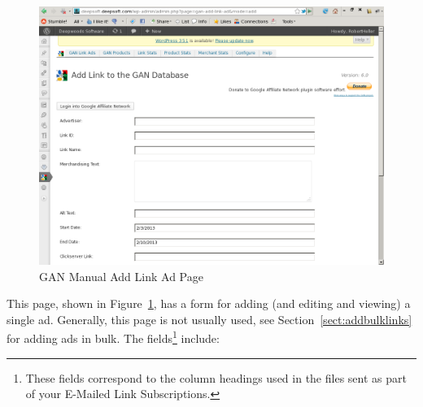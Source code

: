 \documentclass[letterpaper]{article}
\begin{document}
\begin{figure}[ht]
\begin{centering}
\includegraphics[width=4.5in]{ganaddlinkad.png}
\caption{GAN Manual Add Link Ad Page}
\label{fig:ganaddlinkad}
\end{centering}
\end{figure}
This page, shown in Figure~\ref{fig:ganaddlinkad}, has a form for adding
(and editing and viewing) a single ad. Generally, this page is not
usually used, see Section~\ref{sect:addbulklinks} for adding ads in bulk.
The fields\footnote{These fields correspond to the column headings used
in the files sent as part of your E-Mailed Link Subscriptions.}
include: 
\end{document}
